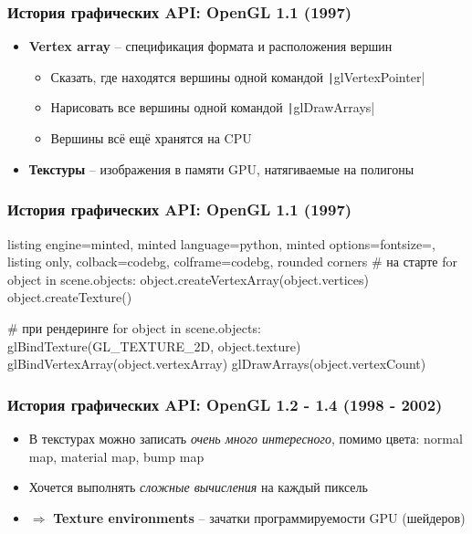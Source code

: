 \documentclass[10pt]{beamer}
\begin{document}
\begin{frame}[fragile]
\frametitle{История графических API: OpenGL 1.1 (1997)}
\begin{itemize}
\item \textbf{Vertex array} -- спецификация формата и расположения вершин
\begin{itemize}
\item Сказать, где находятся вершины одной командой \texttt|glVertexPointer|
\item Нарисовать все вершины одной командой \texttt|glDrawArrays|
\item Вершины всё ещё хранятся на CPU
\end{itemize}
\pause
\item \textbf{Текстуры} -- изображения в памяти GPU, натягиваемые на полигоны
\end{itemize}
\end{frame}

\begin{frame}[fragile]
\frametitle{История графических API: OpenGL 1.1 (1997)}
\begin{tcblisting}{listing engine=minted, minted language=python, minted options={fontsize=\scriptsize}, listing only, colback=codebg, colframe=codebg, rounded corners}
# на старте
for object in scene.objects:
    object.createVertexArray(object.vertices)
    object.createTexture()

# при рендеринге
for object in scene.objects:
    glBindTexture(GL_TEXTURE_2D, object.texture)
    glBindVertexArray(object.vertexArray)
    glDrawArrays(object.vertexCount)
\end{tcblisting}
\end{frame}

\begin{frame}
\frametitle{История графических API: OpenGL 1.2 - 1.4 (1998 - 2002)}
\begin{itemize}
\item В текстурах можно записать \textit{очень много интересного}, помимо цвета: normal map, material map, bump map
\item Хочется выполнять \textit{сложные вычисления} на каждый пиксель
\pause
\item $\Longrightarrow$ \textbf{Texture environments} -- зачатки программируемости GPU (шейдеров)
\end{itemize}
\end{frame}
\end{document}
